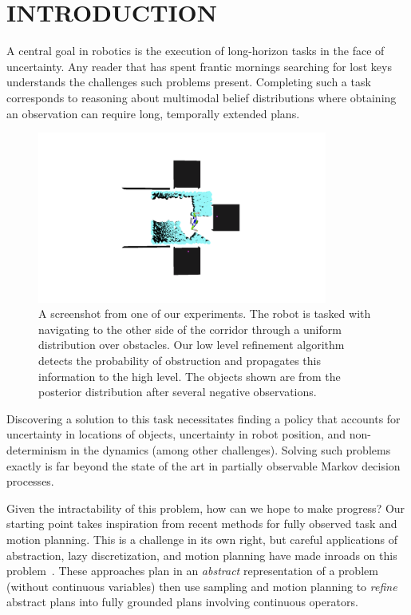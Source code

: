 \section{INTRODUCTION}
A central goal in robotics is the execution of long-horizon tasks in
the face of uncertainty. Any reader that has spent frantic mornings
searching for lost keys understands the challenges such problems
present. Completing such a task corresponds to reasoning about
multimodal belief distributions where obtaining an observation
can require long, temporally extended plans. 
\begin{figure}[h]
  \centering
    \noindent
    \includegraphics[trim = 160mm 90mm 0mm 90mm, clip, width=0.85\textwidth]{corridor_images/corridor_path_2.png}
  \caption{A screenshot from one of our experiments. The robot is
    tasked with navigating to the other side of the corridor through a uniform distribution over obstacles. Our low
    level refinement algorithm detects the probability of obstruction and
    propagates this information to the high level. The objects shown are
    from the posterior distribution after several negative
    observations.}
  \label{fig:knot_steps}
\end{figure}


Discovering a solution to this task necessitates finding a policy that
accounts for uncertainty in locations of objects, uncertainty in robot position,
and non-determinism in the dynamics (among other
challenges). Solving such problems exactly is far beyond the state of
the art in partially observable Markov decision processes.

Given the intractability of this problem, how can we hope to make
progress? Our starting point takes inspiration from recent methods for
fully observed task and motion planning.  This is a challenge in its
own right, but careful applications of abstraction, lazy
discretization, and motion planning have made inroads on this
problem~\cite{srivastava2014combined, lozano2014constraint}. These
approaches plan in an \emph{abstract} representation of a problem
(without continuous variables) then use sampling and motion planning to
\emph{refine} abstract plans into fully grounded plans involving continuous
operators.

